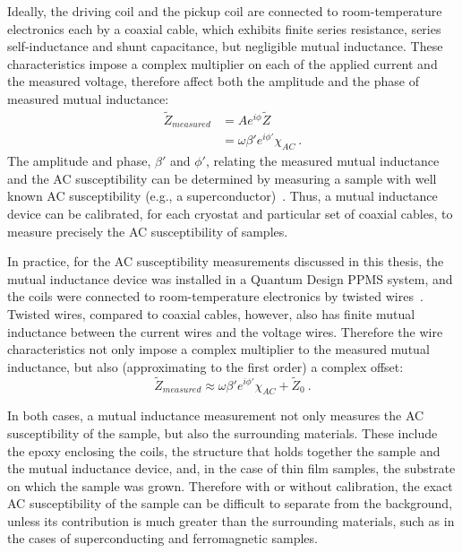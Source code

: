 Ideally, the driving coil and the pickup coil are connected to room-temperature electronics each by a coaxial cable, which exhibits finite series resistance, series self-inductance and shunt capacitance, but negligible mutual inductance. These characteristics impose a complex multiplier on each of the applied current and the measured voltage, therefore affect both the amplitude and the phase of measured mutual inductance:%
\begin{align}%
    \widetilde{Z}_{measured} &= Ae^{i\phi}\widetilde{Z}\nonumber\\
        &= \omega\beta'e^{i\phi'}\chi_{AC}~.\label{eq:mi_coax}
\end{align}%
The amplitude and phase, $\beta'$ and $\phi'$, relating the measured mutual inductance and the AC susceptibility can be determined by measuring a sample with well known AC susceptibility (e.g., a superconductor)~\cite{Jeanneret1989, HahnThesis}. Thus, a mutual inductance device can be calibrated, for each cryostat and particular set of coaxial cables, to measure precisely the AC susceptibility of samples.

In practice, for the AC susceptibility measurements discussed in this thesis, the mutual inductance device was installed in a Quantum Design PPMS system, and the coils were connected to room-temperature electronics by twisted wires~\cite{ppms_ac}. Twisted wires, compared to coaxial cables, however, also has finite mutual inductance between the current wires and the voltage wires. Therefore the wire characteristics not only impose a complex multiplier to the measured mutual inductance, but also (approximating to the first order) a complex offset:%
\begin{equation}%
    \widetilde{Z}_{measured} \approx \omega\beta'e^{i\phi'}\chi_{AC} + \widetilde{Z}_0~.\label{eq:mi_twisted}
\end{equation}%

In both cases, a mutual inductance measurement not only measures the AC susceptibility of the sample, but also the surrounding materials. These include the epoxy enclosing the coils, the structure that holds together the sample and the mutual inductance device, and, in the case of thin film samples, the substrate on which the sample was grown. Therefore with or without calibration, the exact AC susceptibility of the sample can be difficult to separate from the background, unless its contribution is much greater than the surrounding materials, such as in the cases of superconducting and ferromagnetic samples.

